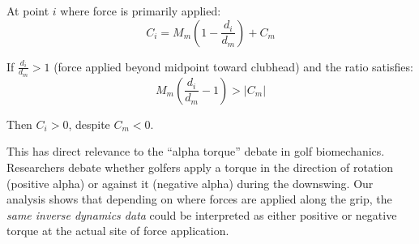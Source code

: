 \documentclass[11pt,a4paper]{article}
\begin{document}
At point $i$ where force is primarily applied:
\begin{equation}
C_i = M_m \left(1 - \frac{d_i}{d_m}\right) + C_m
\end{equation}

If $\frac{d_i}{d_m} > 1$ (force applied beyond midpoint toward clubhead) and the ratio satisfies:
\begin{equation}
M_m \left(\frac{d_i}{d_m} - 1\right) > |C_m|
\end{equation}

Then $C_i > 0$, despite $C_m < 0$.

This has direct relevance to the ``alpha torque'' debate in golf biomechanics. Researchers debate whether golfers apply a torque in the direction of rotation (positive alpha) or against it (negative alpha) during the downswing. Our analysis shows that depending on where forces are applied along the grip, the \emph{same inverse dynamics data} could be interpreted as either positive or negative torque at the actual site of force application.
\end{document}
